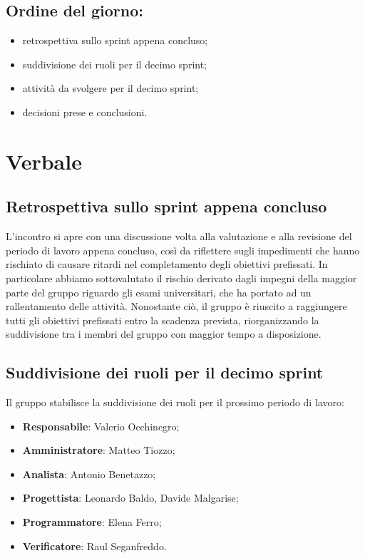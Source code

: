 \documentclass[italian,12pt]{article}
\begin{document}
\subsection*{Ordine del giorno:}
\begin{itemize}
	\item retrospettiva sullo sprint appena concluso;
	\item suddivisione dei ruoli per il decimo sprint;
	\item attività da svolgere per il decimo sprint;
	\item decisioni prese e conclusioni.
\end{itemize}


\newpage

\section{Verbale}

\subsection{Retrospettiva sullo sprint appena concluso}
L'incontro si apre con una discussione volta alla valutazione e alla revisione del periodo di lavoro appena concluso, così da riflettere sugli impedimenti che hanno rischiato di causare ritardi nel completamento degli obiettivi prefissati. In particolare abbiamo sottovalutato il rischio derivato dagli impegni della maggior parte del gruppo riguardo gli esami
universitari, che ha portato
ad un rallentamento delle attività. Nonostante ciò, il gruppo è riuscito a raggiungere tutti gli obiettivi prefissati entro la scadenza prevista,
riorganizzando la suddivisione tra i membri del gruppo con maggior tempo a disposizione.\\

\subsection{Suddivisione dei ruoli per il decimo sprint}
Il gruppo stabilisce la suddivisione dei ruoli per il prossimo periodo di lavoro:
\begin{itemize}
	\item \textbf{Responsabile}: Valerio Occhinegro;
	\item \textbf{Amministratore}: Matteo Tiozzo;
	\item \textbf{Analista}: Antonio Benetazzo;
	\item \textbf{Progettista}: Leonardo Baldo, Davide Malgarise;
	\item \textbf{Programmatore}: Elena Ferro;
	\item \textbf{Verificatore}: Raul Seganfreddo.
\end{itemize}
\end{document}
